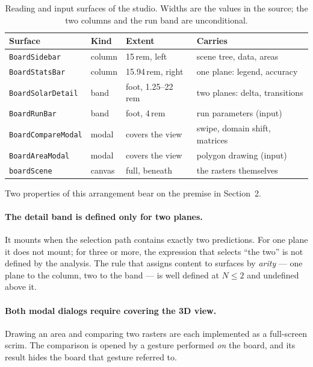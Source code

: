 \documentclass[11pt,a4paper]{article}
\newcommand{\code}[1]{\texttt{\small #1}}
\begin{document}
\begin{table}[t]
\centering
\small
\caption{Reading and input surfaces of the studio. Widths are the values in the
source; the two columns and the run band are unconditional.}
\label{tab:surfaces}
\begin{tabular}{@{}llll@{}}
\toprule
Surface & Kind & Extent & Carries \\
\midrule
\code{BoardSidebar}      & column & 15\,rem, left        & scene tree, data, areas \\
\code{BoardStatsBar}     & column & 15.94\,rem, right    & one plane: legend, accuracy \\
\code{BoardSolarDetail}  & band   & foot, 1.25--22\,rem  & two planes: delta, transitions \\
\code{BoardRunBar}       & band   & foot, 4\,rem         & run parameters (input) \\
\code{BoardCompareModal} & modal  & covers the view      & swipe, domain shift, matrices \\
\code{BoardAreaModal}    & modal  & covers the view      & polygon drawing (input) \\
\code{boardScene}        & canvas & full, beneath        & the rasters themselves \\
\bottomrule
\end{tabular}
\end{table}

Two properties of this arrangement bear on the premise in Section~2.

\paragraph{The detail band is defined only for two planes.} It mounts when the
selection path contains exactly two predictions. For one plane it does not
mount; for three or more, the expression that selects ``the two'' is not
defined by the analysis. The rule that assigns content to surfaces by
\emph{arity} --- one plane to the column, two to the band --- is well defined
at $N \le 2$ and undefined above it.

\paragraph{Both modal dialogs require covering the 3D view.} Drawing an area
and comparing two rasters are each implemented as a full-screen scrim. The
comparison is opened by a gesture performed \emph{on} the board, and its result
hides the board that gesture referred to.
\end{document}
